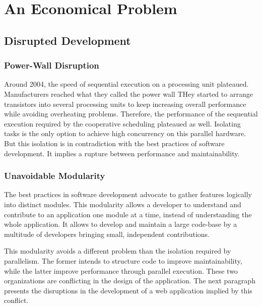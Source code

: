 \section{An Economical Problem} \label{chapter2:problem-statement}


\subsection{Disrupted Development}


\subsubsection{Power-Wall Disruption}


Around 2004, the speed of sequential execution on a processing unit plateaued.
Manufacturers reached what they called the power wall
THey started to arrange transistors into several processing units to keep increasing overall performance while avoiding overheating problems.
Therefore, the performance of the sequential execution required by the cooperative scheduling plateaued as well.
Isolating tasks is the only option to achieve high concurrency on this parallel hardware.
But this isolation is in contradiction with the best practices of software development.
It implies a rupture between performance and maintainability.

\subsubsection{Unavoidable Modularity}

The best practices in software development advocate to gather features logically into distinct modules.
This modularity allows a developer to understand and contribute to an application one module at a time, instead of understanding the whole application.
It allows to develop and maintain a large code-base by a multitude of developers bringing small, independent contributions.

This modularity avoids a different problem than the isolation required by parallelism.
The former intends to structure code to improve maintainability, while the latter improve performance through parallel execution.
These two organizations are conflicting in the design of the application.
The next paragraph presents the disruptions in the development of a web application implied by this conflict.

